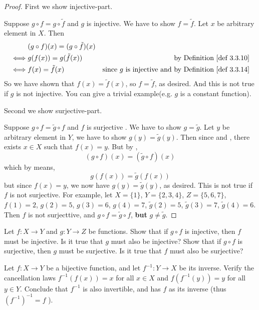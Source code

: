 \begin{proof}
First we show injective-part.

Suppose \(g \circ f = g \circ \tilde{f}\) and \(g\) is injective. We have to show \(f = \tilde{f}\). Let \(x\) be arbitrary element in \(X\). Then
\begin{align*}
         & (g \circ f)(x) = (g \circ \tilde{f})(x) \\
    \iff & g(f(x)) = g(\tilde{f}(x)) & \text{by \DEF{3.3.10}} \\
    \iff & f(x) = \tilde{f}(x)       & \text {since \(g\) is injective and by \DEF{3.3.14}}
\end{align*}
So we have shown that \(f(x) = \tilde{f}(x)\), so \(f = \tilde{f}\), as desired. And this is not true if \(g\) is not injective. You can give a trivial example(e.g. \(g\) is a constant function).

Second we show surjective-part.

Suppose \(g \circ f = \tilde{g} \circ f\)  and \(f\) is surjective . We have to show \(g = \tilde{g}\). Let \(y\) be arbitrary element in \(Y\), we have to show \(g(y) = \tilde{g}(y)\). Then since  and , there exists \(x \in X\) such that \(f(x) = y\). But by ,
\[
    (g \circ f)(x) = (\tilde{g} \circ f)(x)
\]
which by  means,
\[
    g(f(x)) = \tilde{g}(f(x))
\]
but since \(f(x) = y\), we now have \(g(y) = \tilde{g}(y)\), as desired. This is not true if \(f\) is not surjective. For example, let \(X = \{1\}\), \(Y = \{2, 3, 4\}\), \(Z = \{5, 6, 7\}\), \(f(1) = 2\), \(g(2) = 5\), \(g(3) = 6\), \(g(4) = 7\), \(\tilde{g}(2) = 5\), \(\tilde{g}(3) = 7\), \(\tilde{g}(4) = 6\). Then \(f\) is not surjecttive, and \(g \circ f = \tilde{g} \circ f\), \textbf{but} \(g \neq \tilde{g}\).
\end{proof}

\begin{exercise} \label{exercise 3.3.5}
Let \(f : X \rightarrow Y\) and \(g : Y \rightarrow Z\) be functions. Show that if \(g \circ f\) is injective, then \(f\) must be injective. Is it true that \(g\) must also be injective? Show that if \(g \circ f\) is surjective, then \(g\) must be surjective. Is it true that \(f\) must also be surjective?
\end{exercise}

\begin{exercise} \label{exercise 3.3.6}
Let \(f : X \rightarrow Y\) be a bijective function, and let \(f^{-1} : Y \rightarrow X\) be its inverse. Verify the cancellation laws \(f^{-1}(f(x)) = x\) for all \(x \in X\) and \(f(f^{-1}(y)) = y\) for all \(y \in Y\). Conclude that \(f^{-1}\) is also invertible, and has \(f\) as its inverse (thus \( (f^{-1})^{-1} = f \) ).
\end{exercise}

